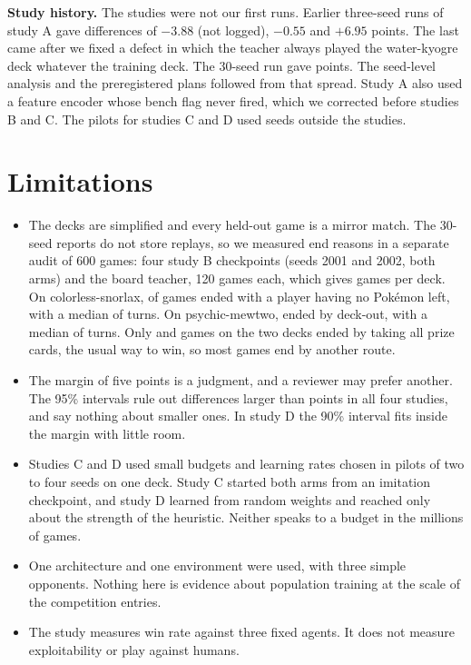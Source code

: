 \documentclass[conference]{IEEEtran}
\begin{document}
\textbf{Study history.} The studies were not our first runs. Earlier three-seed runs of study A gave differences of $-3.88$ (not logged), $-0.55$ and $+6.95$ points. The last came after we fixed a defect in which the teacher always played the water-kyogre deck whatever the training deck. The 30-seed run gave \ADelta{} points. The seed-level analysis and the preregistered plans followed from that spread. Study A also used a feature encoder whose bench flag never fired, which we corrected before studies B and C. The pilots for studies C and D used seeds outside the studies.

\section{Limitations}

\begin{itemize}
  \item The decks are simplified and every held-out game is a mirror match. The 30-seed reports do not store replays, so we measured end reasons in a separate audit of 600 games: four study B checkpoints (seeds 2001 and 2002, both arms) and the board teacher, 120 games each, which gives \AuditGames{} games per deck. On colorless-snorlax, \AuditSnorlaxNoPokemon{} of \AuditGames{} games ended with a player having no Pok\'emon left, with a median of \AuditSnorlaxMedian{} turns. On psychic-mewtwo, \AuditMewtwoDeckOut{} ended by deck-out, with a median of \AuditMewtwoMedian{} turns. Only \AuditSnorlaxPrizes{} and \AuditMewtwoPrizes{} games on the two decks ended by taking all prize cards, the usual way to win, so most games end by another route.
  \item The margin of five points is a judgment, and a reviewer may prefer another. The 95\% intervals rule out differences larger than \MaxBound{} points in all four studies, and say nothing about smaller ones. In study D the 90\% interval fits inside the margin with little room.
  \item Studies C and D used small budgets and learning rates chosen in pilots of two to four seeds on one deck. Study C started both arms from an imitation checkpoint, and study D learned from random weights and reached only about the strength of the heuristic. Neither speaks to a budget in the millions of games.
  \item One architecture and one environment were used, with three simple opponents. Nothing here is evidence about population training at the scale of the competition entries.
  \item The study measures win rate against three fixed agents. It does not measure exploitability or play against humans.
\end{itemize}
\end{document}
